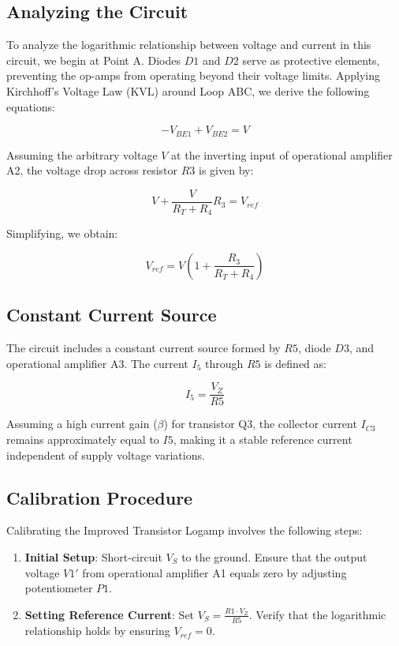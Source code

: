 \documentclass[a4paper,9pt,twoside,openany,twocolumn]{memoir}
\begin{document}
\subsection{Analyzing the Circuit}
To analyze the logarithmic relationship between voltage and current in this circuit, we begin at Point A. Diodes \( D1 \) and \( D2 \) serve as protective elements, preventing the op-amps from operating beyond their voltage limits. Applying Kirchhoff's Voltage Law (KVL) around Loop ABC, we derive the following equations:

\[
- V_{BE1} + V_{BE2} = V
\]

Assuming the arbitrary voltage \( V \) at the inverting input of operational amplifier A2, the voltage drop across resistor \( R3 \) is given by:

\[
V + \frac{V}{R_T + R_4} R_3 = V_{ref}
\]

Simplifying, we obtain:

\[
V_{ref} = V \left(1 + \frac{R_3}{R_T + R_4}\right)
\]

\subsection{Constant Current Source}
The circuit includes a constant current source formed by \( R5 \), diode \( D3 \), and operational amplifier A3. The current \( I_5 \) through \( R5 \) is defined as:

\[
I_5 = \frac{V_Z}{R5}
\]

Assuming a high current gain (\( \beta \)) for transistor Q3, the collector current \( I_{C3} \) remains approximately equal to \( I5 \), making it a stable reference current independent of supply voltage variations.

\subsection{Calibration Procedure}
Calibrating the Improved Transistor Logamp involves the following steps:

\begin{enumerate}
    \item \textbf{Initial Setup}: Short-circuit \( V_S \) to the ground. Ensure that the output voltage \( V1' \) from operational amplifier A1 equals zero by adjusting potentiometer \( P1 \).
    \item \textbf{Setting Reference Current}: Set \( V_S = \frac{R1 \cdot V_Z}{R5} \). Verify that the logarithmic relationship holds by ensuring \( V_{ref} = 0 \).
\end{enumerate}
\end{document}
